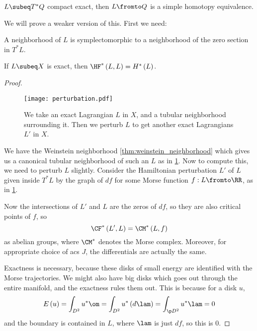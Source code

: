 \documentclass{amsart}
\begin{document}
\begin{thm}
$L\subeq T^* Q$ compact exact, then $L\fromto Q$ is a simple homotopy
equivalence.
\end{thm}

We will prove a weaker version of this.
First we need:

\begin{thm}[Weinstein]
A neighborhood of $L$ is symplectomorphic to 
a neighborhood of the zero section in $T^* L$.
\label{thm:weinstein_neighborhood}
\end{thm}

\begin{prop}[Floer]
If $L\subeq X$ is exact, then
$\HF^*\left( L , L \right) = H^*\left( L \right)$.
\end{prop}

\begin{proof}
\begin{figure}
\texttt{[image: perturbation.pdf]}
\caption{We take an exact Lagrangian $L$ in $X$, and a tubular neighborhood surrounding it. 
Then we perturb $L$ to get another exact Lagrangians $L'$ in $X$.}
\label{fig:perturbation}
\end{figure}
We have the Weinstein neighborhood \cref{thm:weinstein_neighborhood}
which gives us a canonical tubular neighborhood of such an $L$ as in
\cref{fig:perturbation}.
Now to compute this, we need to perturb $L$ slightly. 
Consider the Hamiltonian perturbation $L'$ of $L$ given inside $T^*L$ by the graph
of $df$ for some Morse function $f:L\fromto \RR$, as in \cref{fig:perturbation}.

Now the intersections of $L'$ and $L$ are the zeros of $df$, 
so they are also critical points of $f$, so 
\begin{equation}
\CF^*\left( L' , L \right) = \CM^*\left( L , f \right)
\end{equation}
as abelian groups, where $\CM^*$ denotes the Morse complex.
Moreover, for appropriate choice of acs $J$, 
the differentials are actually the same.

Exactness is necessary, because
these disks of small energy are identified with the Morse trajectories. 
We might also have big disks which goes out through the entire manifold, 
and the exactness rules them out.
This is because for a disk $u$,
\begin{equation}
E\left( u \right)= \int _{D^2} u^* \om = \int_{D^2} u^* \left( d\lam \right)
= \int_{\p D^2} u^* \lam = 0
\end{equation}
and the boundary is contained in $L$, where $\lam$ is just $df$, so this is $0$.
\end{proof}
\end{document}

